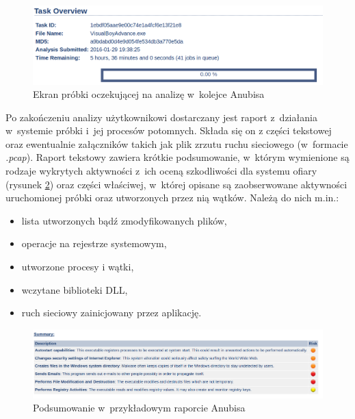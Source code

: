 \documentclass[a4paper,12pt,oneside]{article}
\begin{document}
	\begin{figure}[ht]
		\includegraphics[scale=0.35]{gfx/anubis-queue.png}
		\caption{Ekran próbki oczekującej na analizę w~kolejce Anubisa}
		\label{gfx-anubis-queue}
	\end{figure}
	
	Po zakończeniu analizy użytkownikowi dostarczany jest raport z~działania w~systemie próbki i~jej procesów potomnych. Składa się on z części tekstowej oraz ewentualnie załączników takich jak plik zrzutu ruchu sieciowego (w~formacie \textit{.pcap}). Raport tekstowy zawiera krótkie podsumowanie, w~którym wymienione są rodzaje wykrytych aktywności z~ich oceną szkodliwości dla systemu ofiary (rysunek \ref{gfx-anubis-report}) oraz części właściwej, w~której opisane są zaobserwowane aktywności uruchomionej próbki oraz utworzonych przez nią wątków. Należą do nich m.in.:	
	\begin{itemize}
		\item lista utworzonych bądź zmodyfikowanych plików,
		\item operacje na rejestrze systemowym,
		\item utworzone procesy i wątki,
		\item wczytane biblioteki DLL,
		\item ruch sieciowy zainicjowany przez aplikację.
	\end{itemize}
	
	\begin{figure}[ht]
		\includegraphics[scale=0.26]{gfx/anubis-report.png}
		\caption{Podsumowanie w~przykładowym raporcie Anubisa}
		\label{gfx-anubis-report}
	\end{figure}
	
\end{document}
